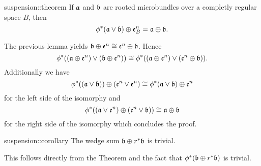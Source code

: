 \begin{mytheorem}{suspension::theorem}
    If $\mathfrak{a}$ and $\mathfrak{b}$ are rooted microbundles over a completly regular space $B$, then
    \[ \phi^*(\mathfrak{a} \vee \mathfrak{b}) \oplus{} \mathfrak{e}^{n}_B = \mathfrak{a} \oplus{} \mathfrak{b}. \]
\end{mytheorem}

\begin{myproof}
    The previous lemma yields $\mathfrak{b} \oplus{} \mathfrak{e}^{n} \cong \mathfrak{e}^{n} \oplus{} \mathfrak{b}$.
    Hence
    \[ \phi^*((\mathfrak{a} \oplus{} \mathfrak{e}^{n}) \vee (\mathfrak{b} \oplus{} \mathfrak{e}^{n})) \cong \phi^*((\mathfrak{a} \oplus{} \mathfrak{e}^{n}) \vee (\mathfrak{e}^{n} \oplus{} \mathfrak{b})). \]
    Additionally we have
    \[ \phi^*((\mathfrak{a} \vee \mathfrak{b})) \oplus{} (\mathfrak{e}^{n} \vee \mathfrak{e}^{n}) \cong \phi^*(\mathfrak{a} \vee \mathfrak{b}) \oplus{} \mathfrak{e}^{n} \]
    for the left side of the isomorphy and
    \[ \phi^*((\mathfrak{a} \vee \mathfrak{e}^{n}) \oplus{} (\mathfrak{e}^{n} \vee \mathfrak{b})) \cong \mathfrak{a} \oplus{} \mathfrak{b}\]
    for the right side of the isomorphy which concludes the proof.
\end{myproof}

\begin{mycorollary}{suspension::corollary}
    The wedge sum $\mathfrak{b} \oplus{} r^*\mathfrak{b}$ is trivial.
\end{mycorollary}

\begin{myproof}
    This follows directly from the Theorem and the fact that $\phi^*(\mathfrak{b} \oplus{} r^*\mathfrak{b})$ is trivial.
\end{myproof}

